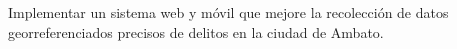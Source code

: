 Implementar un sistema web y móvil que mejore la recolección de datos
georreferenciados precisos de delitos en la ciudad de Ambato.

